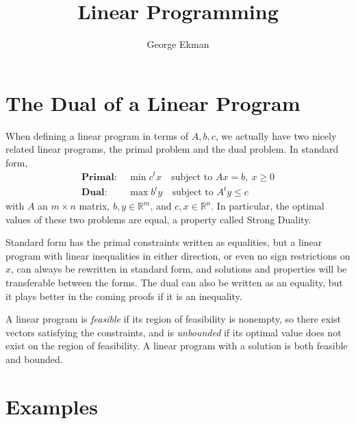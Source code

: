 \documentclass{article}
\title{Linear Programming}
\author{George Ekman}
\newcommand\R{{\mathbb{R}}}
\begin{document}
\maketitle

\section{The Dual of a Linear Program}

When defining a linear program in terms of $A, b, c$, we actually have two nicely related linear
programs, the primal problem and the dual problem. In standard form,
\begin{align*}
	\textbf{Primal: } & \min c^t x \quad \text{subject to } Ax = b,\ x \ge 0 \\
	\textbf{Dual: } & \max b^t y \quad \text{subject to } A^t y \le c
\end{align*}
with $A$ an $m \times n$ matrix, $b, y \in \R^m$, and $c, x \in \R^n$. In particular, the
optimal values of these two problems are equal, a property called Strong Duality.

Standard form has the primal constraints written as equalities, but a linear program with linear
inequalities in either direction, or even no sign restrictions on $x$, can always be rewritten in
standard form, and solutions and properties will be transferable between the forms. The dual can
also be written as an equality, but it plays better in the coming proofs if it is an inequality.

A linear program is \emph{feasible} if its region of feasibility is nonempty, so there exist
vectors satisfying the constraints, and is \emph{unbounded} if its optimal value does not exist on
the region of feasibility. A linear program with a solution is both feasible and bounded.

\section{Examples}
\end{document}
